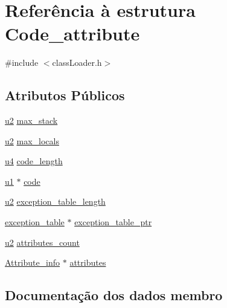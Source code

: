 \hypertarget{struct_code__attribute}{}\section{Referência à estrutura Code\+\_\+attribute}
\label{struct_code__attribute}


{\ttfamily \#include $<$class\+Loader.\+h$>$}

\subsection*{Atributos Públicos}
\begin{DoxyCompactItemize}
\item 
\hyperlink{util_8h_a55ef8d87fd202b8417704c089899c5b9}{u2} \hyperlink{struct_code__attribute_a300885ff1326f01f7c86e7b4425f0d35}{max\+\_\+stack}
\item 
\hyperlink{util_8h_a55ef8d87fd202b8417704c089899c5b9}{u2} \hyperlink{struct_code__attribute_ad710ec86a1d37c6daa999383f8f2fd35}{max\+\_\+locals}
\item 
\hyperlink{util_8h_ae391a1d79bb0c8cbc283f0283e3c098b}{u4} \hyperlink{struct_code__attribute_a80af47e824a13ef4dc604e5b8671f793}{code\+\_\+length}
\item 
\hyperlink{util_8h_a64f8055b64cf2a4c299c841130c5c938}{u1} $\ast$ \hyperlink{struct_code__attribute_a26d83aeded05528b11dd486555d1ece2}{code}
\item 
\hyperlink{util_8h_a55ef8d87fd202b8417704c089899c5b9}{u2} \hyperlink{struct_code__attribute_a24b063ad994d77688db7468fae11e7aa}{exception\+\_\+table\+\_\+length}
\item 
\hyperlink{structexception__table}{exception\+\_\+table} $\ast$ \hyperlink{struct_code__attribute_af5c8031eb2ccf44c7684e4cb02169f14}{exception\+\_\+table\+\_\+ptr}
\item 
\hyperlink{util_8h_a55ef8d87fd202b8417704c089899c5b9}{u2} \hyperlink{struct_code__attribute_a9ca1435aa65ae02d764ff53a36fb842f}{attributes\+\_\+count}
\item 
\hyperlink{struct_attribute__info}{Attribute\+\_\+info} $\ast$ \hyperlink{struct_code__attribute_ad42c1c926ade7cce485bed5e59184049}{attributes}
\end{DoxyCompactItemize}


\subsection{Documentação dos dados membro}
\mbox{\label{struct_code__attribute_ad42c1c926ade7cce485bed5e59184049}} 
